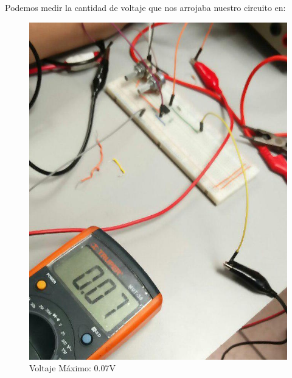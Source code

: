 \documentclass[12pt, fleqn]{article}                            %
\theoremstyle{break}                                            %
\begin{document}
            Podemos medir la cantidad de voltaje que nos arrojaba nuestro circuito 
            en:
            \begin{figure}[!htb]
                \centering
                \begin{minipage}{.5\textwidth}
                    \centering
                \includegraphics[width=0.85\linewidth]{Medicion2VoltajeMin}
                \caption{Voltaje Máximo: 0.07V}
                \end{minipage}%
                \begin{minipage}{0.5\textwidth}
                    \centering

\end{minipage}
\end{figure}
\end{document}

